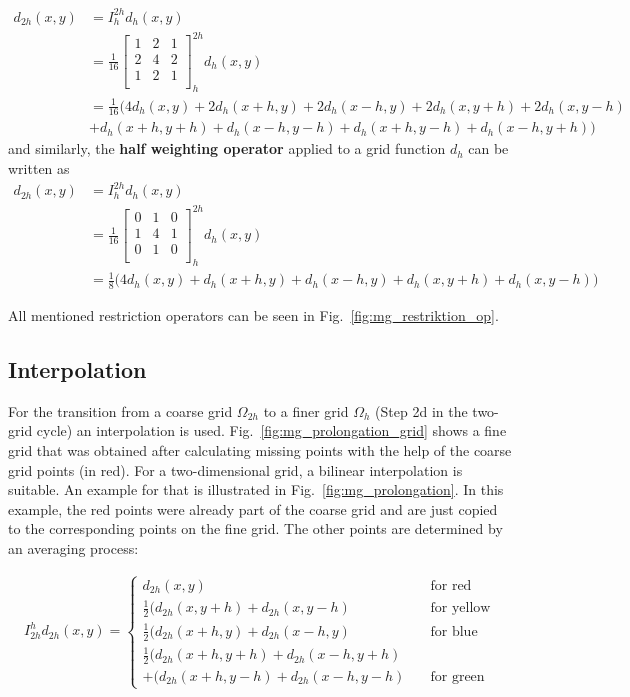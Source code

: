 \begin{align}
d_{2h}(x,y) &= I_h^{2h} d_h(x,y)\nonumber \\
&=  \frac{1}{16}\begin{bmatrix}
1 & 2 & 1\\
2 & 4 & 2\\
1 & 2 & 1\\
\end{bmatrix}_h^{2h} d_h(x,y) \\
& = \frac{1}{16} \Big(4 d_h(x,y) + 2 d_h(x+h,y) + 2 d_h(x-h,y) + 2 d_h(x,y+h) + 2 d_h(x,y-h) \nonumber \\ 
& + d_h(x+h,y+h) + d_h(x-h,y-h) + d_h(x+h,y-h) + d_h(x-h,y+h)\Big ) \nonumber
\end{align}
and similarly, the \textbf{half weighting operator} applied to  a grid function $d_h$ can be written as
\begin{align}
d_{2h}(x,y) &= I_h^{2h} d_h(x,y)\nonumber \\
&=  \frac{1}{16}\begin{bmatrix}
0 & 1 & 0\\
1 & 4 & 1\\
0 & 1 & 0\\
\end{bmatrix}_h^{2h} d_h(x,y) \\
& = \frac{1}{8} \Big(4 d_h(x,y) +  d_h(x+h,y) +  d_h(x-h,y) +  d_h(x,y+h) +  d_h(x,y-h) \Big ) \nonumber 
\end{align}

All mentioned restriction operators can be seen in Fig.~\ref{fig:mg_restriktion_op}.

\subsection{Interpolation}
For the transition from a coarse grid $\Omega_{2h}$ to a finer grid $\Omega_h$ (Step 2d in the two-grid cycle) an interpolation is used. Fig.~\ref{fig:mg_prolongation_grid} shows a fine grid that was obtained after calculating missing points with the help of the coarse grid points (in red). For a two-dimensional grid, a bilinear interpolation is suitable. An example for that is illustrated in Fig.~\ref{fig:mg_prolongation}. In this example, the red points were already part of the coarse grid and are just copied to the corresponding points on the fine grid. The other points are determined by an averaging process:

\begin{align}
I_{2h}^h d_{2h}(x,y) =
  \begin{cases}
    d_{2h}(x,y)                                      & \quad \text{for red}\\
    \frac{1}{2} \big ( d_{2h}(x,y+h) + d_{2h}(x,y-h) & \quad \text{for yellow}\\
    \frac{1}{2} \big ( d_{2h}(x+h,y) + d_{2h}(x-h,y) & \quad \text{for blue}\\
    \frac{1}{2} \big ( d_{2h}(x+h,y+h) + d_{2h}(x-h,y+h) \\
    + \big ( d_{2h}(x+h,y-h) + d_{2h}(x-h,y-h) & \quad \text{for green}
  \end{cases}
\end{align}

